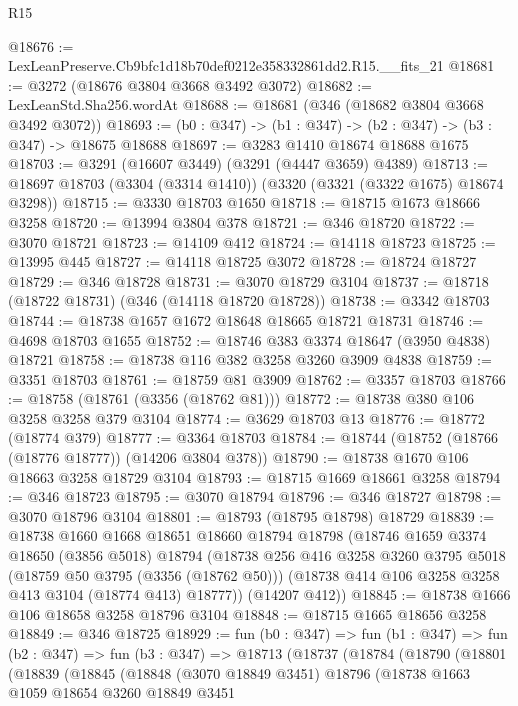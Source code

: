 \begin{lexlean}{R15}
\begin{coremodule}
@18676 := LexLeanPreserve.Cb9bfc1d18b70def0212e358332861dd2.R15.__fits_21
@18681 := @3272 (@18676 @3804 @3668 @3492 @3072)
@18682 := LexLeanStd.Sha256.wordAt
@18688 := @18681 (@346 (@18682 @3804 @3668 @3492 @3072))
@18693 := (b0 : @347) -> (b1 : @347) -> (b2 : @347) -> (b3 : @347) -> @18675 @18688
@18697 := @3283 @1410 @18674 @18688 @1675
@18703 := @3291 (@16607 @3449) (@3291 (@4447 @3659) @4389)
@18713 := @18697 @18703 (@3304 (@3314 @1410)) (@3320 (@3321 (@3322 @1675) @18674 @3298))
@18715 := @3330 @18703 @1650
@18718 := @18715 @1673 @18666 @3258
@18720 := @13994 @3804 @378
@18721 := @346 @18720
@18722 := @3070 @18721
@18723 := @14109 @412
@18724 := @14118 @18723
@18725 := @13995 @445
@18727 := @14118 @18725 @3072
@18728 := @18724 @18727
@18729 := @346 @18728
@18731 := @3070 @18729 @3104
@18737 := @18718 (@18722 @18731) (@346 (@14118 @18720 @18728))
@18738 := @3342 @18703
@18744 := @18738 @1657 @1672 @18648 @18665 @18721 @18731
@18746 := @4698 @18703 @1655
@18752 := @18746 @383 @3374 @18647 (@3950 @4838) @18721
@18758 := @18738 @116 @382 @3258 @3260 @3909 @4838
@18759 := @3351 @18703
@18761 := @18759 @81 @3909
@18762 := @3357 @18703
@18766 := @18758 (@18761 (@3356 (@18762 @81)))
@18772 := @18738 @380 @106 @3258 @3258 @379 @3104
@18774 := @3629 @18703 @13
@18776 := @18772 (@18774 @379)
@18777 := @3364 @18703
@18784 := @18744 (@18752 (@18766 (@18776 @18777)) (@14206 @3804 @378))
@18790 := @18738 @1670 @106 @18663 @3258 @18729 @3104
@18793 := @18715 @1669 @18661 @3258
@18794 := @346 @18723
@18795 := @3070 @18794
@18796 := @346 @18727
@18798 := @3070 @18796 @3104
@18801 := @18793 (@18795 @18798) @18729
@18839 := @18738
    @1660
    @1668
    @18651
    @18660
    @18794
    @18798
    (@18746
      @1659
      @3374
      @18650
      (@3856 @5018)
      @18794
      (@18738
        @256
        @416
        @3258
        @3260
        @3795
        @5018
        (@18759 @50 @3795 (@3356 (@18762 @50)))
        (@18738 @414 @106 @3258 @3258 @413 @3104 (@18774 @413) @18777))
      (@14207 @412))
@18845 := @18738 @1666 @106 @18658 @3258 @18796 @3104
@18848 := @18715 @1665 @18656 @3258
@18849 := @346 @18725
@18929 := fun (b0 : @347) =>
  fun (b1 : @347) =>
  fun (b2 : @347) =>
  fun (b3 : @347) =>
  @18713
    (@18737
      (@18784
        (@18790
          (@18801
            (@18839
              (@18845
                (@18848
                  (@3070 @18849 @3451)
                  @18796
                  (@18738
                    @1663
                    @1059
                    @18654
                    @3260
                    @18849
                    @3451

\end{coremodule}
\end{lexlean}
